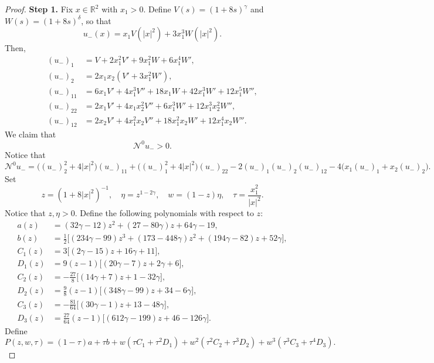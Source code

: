 \documentclass[11pt]{amsart}
\renewcommand{\ge}{>}
\newcommand{\rr}{{\mathbb{R}}}
\theoremstyle{definition}
\theoremstyle{remark}
\numberwithin{equation}{section}
\begin{document}
\begin{proof}
\smallskip
\noindent\textbf{Step 1.}
Fix $x\in\rr^2$ with $x_1>0$. 
Define $V(s)=(1+8s)^\gamma$ and $W(s)=(1+8s)^\delta$, so that 
\begin{equation*}
    u_-(x)=x_1 V(|x|^2)+3x_1^3 W(|x|^2).
\end{equation*} 
 Then,
\begin{equation}\label{variederivatrebdin39gfnvitvnei}
 \begin{split}
(u_-)_1&=V+2x_1^2V'+9x_1^2W+6x_1^4W',\\
 (u_-)_2&=2x_1x_2(V'+3x_1^2W'),\\
 (u_-)_{11}&=6x_1V'+4x_1^3V''+18x_1W+42x_1^3W'+12x_1^5W'',\\
 (u_-)_{22}&=2x_1V'+4x_1x_2^2V''+6x_1^3W'+12x_1^3x_2^2W'',\\
 (u_-)_{12}&=2x_2V'+4x_1^2x_2V''+18x_1^2x_2W'+12x_1^4x_2W''.
 \end{split}
\end{equation}
We claim that 
\begin{equation}\label{eq_planar_numerator_identity_manonevero}
\mathcal N^0u_-
 \ge 0.
\end{equation}
Notice that 
\[
 \mathcal N^0u_-=\big((u_-)_2^2+4|x|^2\big)(u_-)_{11}
 +\big((u_-)_1^2+4|x|^2\big)(u_-)_{22}
 -2(u_-)_1(u_-)_2(u_-)_{12}-4\big(x_1(u_-)_1+x_2(u_-)_2\big).
\]
Set
\[
 z=(1+8|x|^2)^{-1},\quad \eta=z^{1-2\gamma},\quad
 w=(1-z)\eta,\quad \tau=\frac{x_1^2}{|x|^2}.
\]
Notice that $z,\eta\ge 0$. Define the following polynomials with respect to $z:$
\begin{align*}
 a(z)&=(32\gamma-12)z^2+(27-80\gamma)z+64\gamma-19,\\
 b(z)&=\tfrac12\big[(234\gamma-99)z^3+(173-448\gamma)z^2
                   +(194\gamma-82)z+52\gamma\big],\\
 C_1(z)&=3\big[(2\gamma-15)z+16\gamma+11\big],\\
 D_1(z)&=9(z-1)\big[(20\gamma-7)z+2\gamma+6\big],\\
 C_2(z)&=-\tfrac{27}{8}\big[(14\gamma+7)z+1-32\gamma\big],\\
 D_2(z)&=\tfrac98(z-1)\big[(348\gamma-99)z+34-6\gamma\big],\\
 C_3(z)&=-\tfrac{81}{64}\big[(30\gamma-1)z+13-48\gamma\big],\\
 D_3(z)&=\tfrac{27}{64}(z-1)\big[(612\gamma-199)z+46-126\gamma\big].
\end{align*}
Define
\begin{equation*}
 P(z,w,\tau)=(1-\tau)a+\tau b
       +w(\tau C_1+\tau^2D_1)+w^2(\tau^2C_2+\tau^3D_2)
       +w^3(\tau^3C_3+\tau^4D_3).

\end{equation*}
\end{proof}
\end{document}
